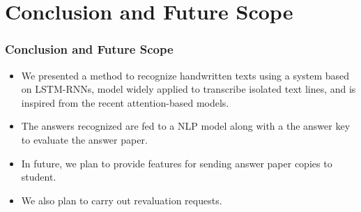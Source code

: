 \section{Conclusion and Future Scope}
\begin{frame}
\frametitle{Conclusion and Future Scope}
\begin{itemize}
    \item We presented a method to recognize handwritten texts using a 
    system based on LSTM-RNNs, model widely applied to transcribe 
    isolated text lines, and is inspired from the recent attention-based models.
    \item The answers recognized are fed to a NLP model along with a the answer key
    to evaluate the answer paper.
    \item In future, we plan to provide features for sending answer paper copies to student.
    \item We also plan to carry out revaluation requests.
\end{itemize}
\end{frame}